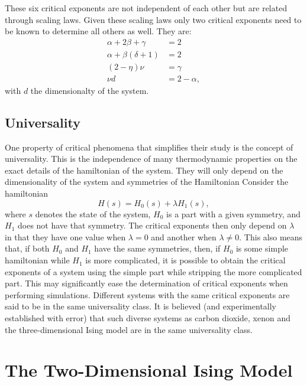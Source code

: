 \documentclass[11pt, a4paper]{report} %
\begin{document}
These six critical exponents are not independent of each other but are related through scaling laws.
Given these scaling laws only two critical exponents need to be known to determine all others as well.
They are:
\begin{align}
	\alpha + 2\beta +\gamma &= 2\\
	\alpha + \beta(\delta+1) &= 2\\
	(2-\eta)\nu &= \gamma \\
	\nu d &= 2- \alpha,
\end{align}
with \(d\) the dimensionalty of the system.\cite{binney:1992,baxter:1989,landau:2015}


\subsection{Universality}
One property of critical phenomena that simplifies their study is the concept of universality.
This is the independence of many thermodynamic properties on the exact details of the hamiltonian of the system.
They will only depend on the dimensionality of the system and symmetries of the Hamiltonian
Consider the hamiltonian
\begin{equation}
	H(s) = H_0(s) + \lambda H_1(s),
\end{equation}
where \(s\) denotes the state of the system, \(H_0\) is a part with a given symmetry, and \(H_1\) does not have that symmetry.
The critical exponents then only depend on \(\lambda\) in that they have one value when \(\lambda=0\) and another when \(\lambda \neq 0\).
This also means that, if both \(H_0\) and \(H_1\) have the same symmetries, then, if \(H_0\) is some simple hamiltonian while \(H_1\) is more complicated, it is possible to obtain the critical exponents of a system using the simple part while stripping the more complicated part.
This may significantly ease the determination of critical exponents when performing simulations.
Different systems with the same critical exponents are said to be in the same universality class.
It is believed (and experimentally established with error) that such diverse systems as carbon dioxide, xenon and the three-dimensional Ising model are in the same universality class.\cite{baxter:1989}

\section{The Two-Dimensional Ising Model} \label{sec:ising_model}
\end{document}
